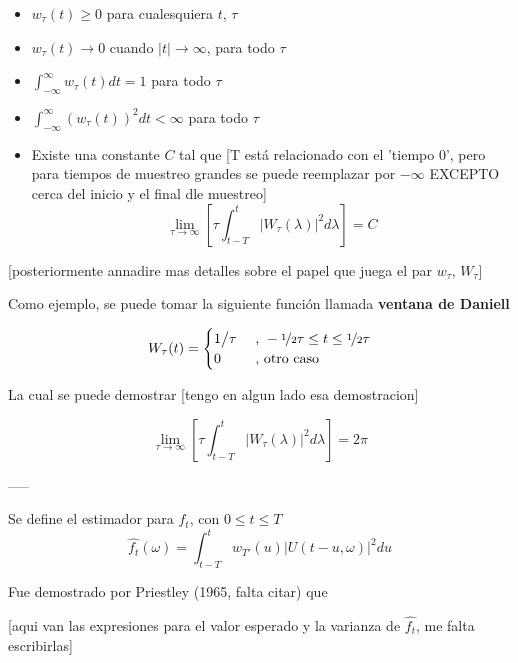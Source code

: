 \begin{itemize}
\item $w_{\tau}(t) \geq 0$ para cualesquiera $t$, $\tau$
\item $w_{\tau}(t) \rightarrow 0$ cuando $\lvert t \lvert \rightarrow \infty$, para todo $\tau$
\item $\displaystyle \int_{-\infty}^{\infty} w_{\tau}(t) dt = 1$ para todo $\tau$
\item $\displaystyle \int_{-\infty}^{\infty} \left( w_{\tau}(t) \right)^{2} dt < \infty$ para todo $\tau$
\item Existe una constante $C$ tal que  [T est\'a relacionado con el 'tiempo 0', pero para
tiempos de muestreo grandes se puede reemplazar por $-\infty$ EXCEPTO cerca del inicio y el final dle muestreo]
$$\lim_{\tau\rightarrow\infty} \left[ \tau \int_{t-T}^{t} \lvert W_{\tau}(\lambda) \lvert^{2} d\lambda \right] = C$$
\end{itemize}


[posteriormente annadire mas detalles sobre el papel que juega el par $w_\tau$, $W_\tau$]

Como ejemplo, se puede tomar la siguiente funci\'on llamada \textbf{ventana de Daniell}

\begin{equation*}
W_\tau (t) = 
\begin{cases}
{1 \big{/} \tau} & \text{ , } -\nicefrac{1}{2} \tau \leq t \leq \nicefrac{1}{2} \tau
\\
0 & \text{ , otro caso}
\end{cases}
\end{equation*}

La cual se puede demostrar [tengo en algun lado esa demostracion]

$$\lim_{\tau\rightarrow\infty} \left[ \tau \int_{t-T}^{t} \lvert W_{\tau}(\lambda) \lvert^{2} d\lambda \right] = 2\pi$$

-----

Se define el estimador para $f_t$, con $0 \leq t \leq T$
\begin{equation*}
\widehat{f_t}(\omega) = \int_{t-T}^{t} w_{T'}(u) \lvert U(t-u,\omega) \lvert^{2} du
\end{equation*}

Fue demostrado por Priestley (1965, falta citar) que 

[aqui van las expresiones para el valor esperado y la varianza de $\widehat{f_t}$, me falta
escribirlas]

